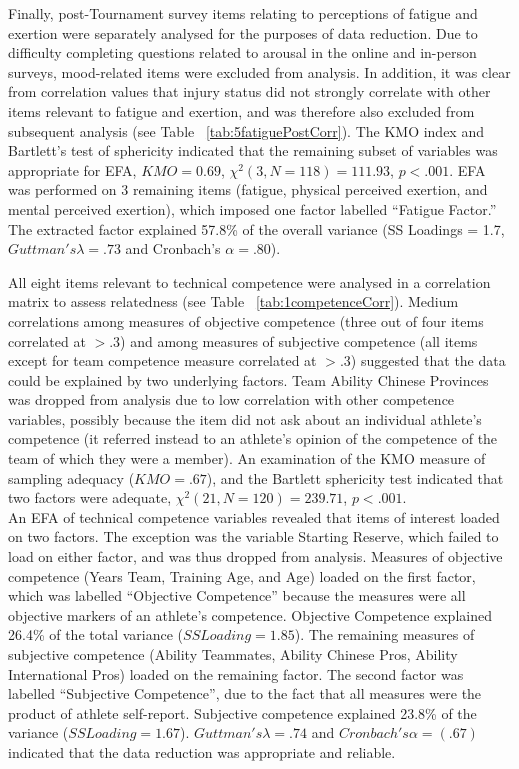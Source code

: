 Finally, post-Tournament survey items relating to perceptions of fatigue and exertion were separately analysed for the purposes of data reduction.  Due to difficulty completing questions related to arousal in the online and in-person surveys, mood-related items were excluded from analysis.  In addition, it was clear from correlation values that injury status did not strongly correlate with other items relevant to fatigue and exertion, and was therefore also excluded from subsequent analysis (see Table ~\ref{tab:5fatiguePostCorr}).  The KMO index and Bartlett's test of sphericity indicated that the remaining subset of variables was appropriate for EFA, $KMO =  0.69$, $\chi^2(3, N = 118) = 111.93$, $p < .001$. EFA was performed on 3 remaining items (fatigue, physical perceived exertion, and mental perceived exertion), which imposed one factor labelled ``Fatigue Factor.''  The extracted factor explained 57.8\% of the overall variance (SS Loadings = 1.7, $Guttman's\lambda =.73$ and Cronbach's $\alpha = .80$).

All eight items relevant to technical competence were analysed in a correlation matrix to assess relatedness (see Table ~\ref{tab:1competenceCorr}). Medium correlations among measures of objective competence (three out of four items correlated at $> .3$) and among measures of subjective competence (all items except for team competence measure correlated at $> .3$) suggested that the data could be explained by two underlying factors. Team Ability Chinese Provinces was dropped from analysis due to low correlation with other competence variables, possibly because the item did not ask about an individual athlete’s competence (it referred instead to an athlete’s opinion of the competence of the team of which they were a member). An examination of the KMO measure of sampling adequacy ($KMO = .67$), and the Bartlett sphericity test indicated that two factors were adequate, $\chi^2(21, N = 120) = 239.71$, $p < .001$. \\

An EFA of technical competence variables revealed that items of interest loaded on two factors. The exception was the variable Starting Reserve, which failed to load on either factor, and was thus dropped from analysis. Measures of objective competence (Years Team, Training Age, and Age) loaded on the first factor, which was labelled ``Objective Competence'' because the measures were all objective markers of an athlete's competence.  Objective Competence explained 26.4\% of the total variance ($SS Loading = 1.85$). The remaining measures of subjective competence (Ability Teammates, Ability Chinese Pros, Ability International Pros) loaded on the remaining factor.  The second factor was labelled ``Subjective Competence'', due to the fact that all measures were the product of athlete self-report.  Subjective competence explained 23.8\% of the variance ($SS Loading = 1.67$). $Guttman's \lambda =.74$ and $Cronbach's \alpha = (.67)$ indicated that the data reduction was appropriate and reliable.











